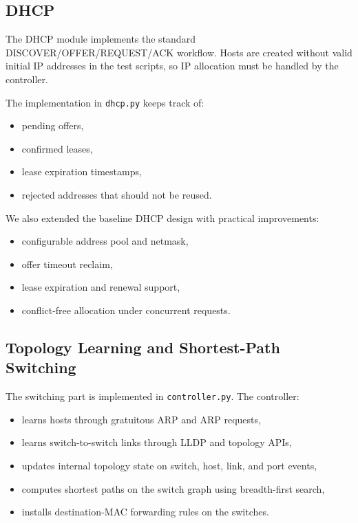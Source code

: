 \documentclass[11pt,a4paper]{article}
\begin{document}
\subsection{DHCP}

The DHCP module implements the standard DISCOVER/OFFER/REQUEST/ACK workflow. Hosts are
created without valid initial IP addresses in the test scripts, so IP allocation must be
handled by the controller.

The implementation in \texttt{dhcp.py} keeps track of:

\begin{itemize}[leftmargin=1.5em]
    \item pending offers,
    \item confirmed leases,
    \item lease expiration timestamps,
    \item rejected addresses that should not be reused.
\end{itemize}

We also extended the baseline DHCP design with practical improvements:

\begin{itemize}[leftmargin=1.5em]
    \item configurable address pool and netmask,
    \item offer timeout reclaim,
    \item lease expiration and renewal support,
    \item conflict-free allocation under concurrent requests.
\end{itemize}

\subsection{Topology Learning and Shortest-Path Switching}

The switching part is implemented in \texttt{controller.py}. The controller:

\begin{itemize}[leftmargin=1.5em]
    \item learns hosts through gratuitous ARP and ARP requests,
    \item learns switch-to-switch links through LLDP and topology APIs,
    \item updates internal topology state on switch, host, link, and port events,
    \item computes shortest paths on the switch graph using breadth-first search,
    \item installs destination-MAC forwarding rules on the switches.
\end{itemize}
\end{document}
